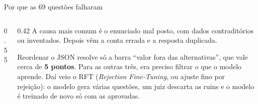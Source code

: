 \documentclass[aspectratio=169,11pt]{beamer}
\begin{document}
\begin{frame}{Por que as 69 questões falharam}
  \begin{columns}[c]
    \begin{column}{0.55\textwidth}
      \centering
    \end{column}
    \begin{column}{0.42\textwidth}
      \small
      A causa mais comum é o enunciado mal posto, com dados contraditórios ou inventados.
      Depois vêm a conta errada e a resposta duplicada.
      \vspace{4pt}

      Reordenar o JSON resolve só a barra ``valor fora das alternativas'', que vale cerca de \textbf{5 pontos}.
      Para as outras três, era preciso filtrar o que o modelo aprende. Daí veio o RFT (\emph{Rejection Fine-Tuning}, ou ajuste fino por rejeição): o modelo gera várias questões, um juiz descarta as ruins e o modelo é treinado de novo só com as aprovadas.
    \end{column}
  \end{columns}
\end{frame}

\end{document}
